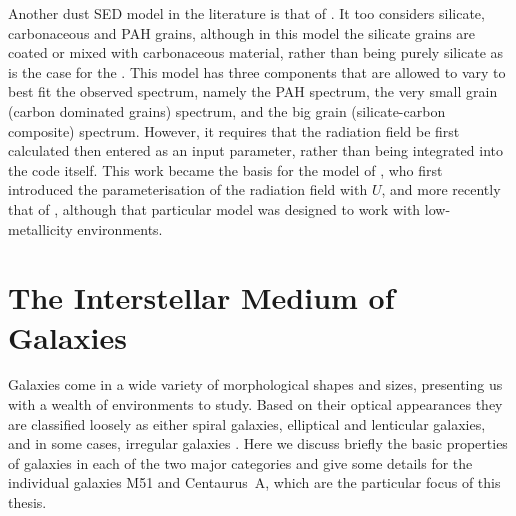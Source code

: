 Another dust SED model in the literature is that of \citet{1990A&A...237..215D}.  It too considers silicate, carbonaceous and PAH grains, although in this model the silicate grains are coated or mixed with carbonaceous material, rather than being purely silicate as is the case for the \citet{2007ApJ...657..810D}.  This model has three components that are allowed to vary to best fit the observed spectrum, namely the PAH spectrum, the very small grain (carbon dominated grains) spectrum, and the big grain (silicate-carbon composite) spectrum.  However, it requires that the radiation field be first calculated then entered as an input parameter, rather than being integrated into the code itself.  This work became the basis for the model of \citet{2001ApJ...549..215D}, who first introduced the parameterisation of the radiation field with $U$, and more recently that of \citet{2011A&A...536A..88G}, although that particular model was designed to work with low-metallicity environments.

\section{The Interstellar Medium of Galaxies}\label{galaxies}
Galaxies come in a wide variety of morphological shapes and sizes, presenting us with a wealth of environments to study.  Based on their optical appearances they are classified loosely as either spiral galaxies, elliptical and lenticular galaxies, and in some cases, irregular galaxies \citep{1926ApJ....64..321H}.  Here we discuss briefly the basic properties of galaxies in each of the two major categories and give some details for the individual galaxies M51 and Centaurus~A, which are the particular focus of this thesis.

